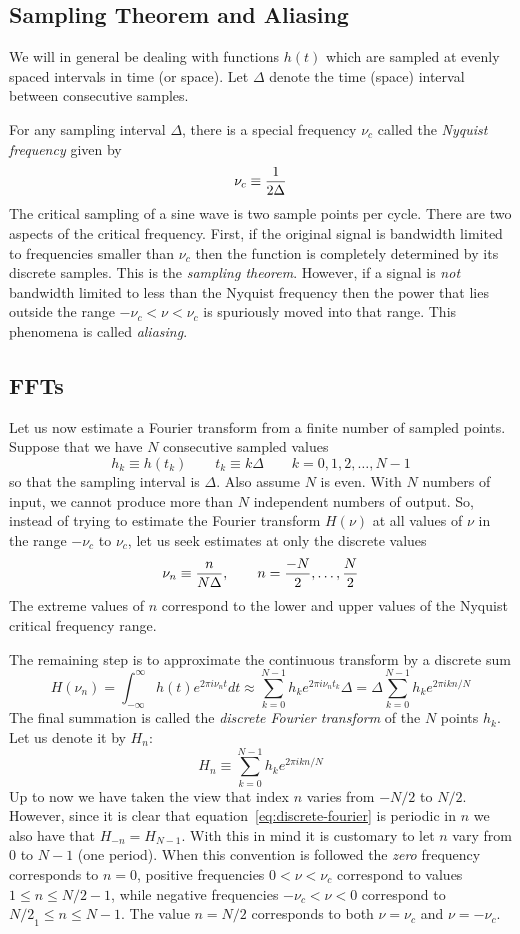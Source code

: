 \documentclass{article}
\newcommand{\be}{\begin{equation}}
\newcommand{\ee}{\end{equation}}
\newcommand{\infint}{\int_{-\infty}^{\infty}}
\begin{document}
\subsection*{Sampling Theorem and Aliasing}

We will in general be dealing with functions $h(t)$ which are sampled
at evenly spaced intervals in time (or space). Let $\Delta$ denote the 
time (space) interval between consecutive samples.

For any sampling interval $\Delta$, there is a special frequency
$\nu_c$ called the {\it Nyquist frequency} given by 
\[
\nu_c\equiv{1\over 2\Delta}
\]
The critical sampling of a sine wave is two sample points per
cycle. There are two aspects of the critical frequency. First, if the
original signal is bandwidth limited to frequencies smaller than
$\nu_c$ then the function is completely determined by its discrete
samples. This is the {\it sampling theorem}. However, if a signal is
{\it not} bandwidth limited to less than the Nyquist frequency then
the power that lies outside the range $-\nu_c<\nu<\nu_c$ is spuriously
moved into that range. This phenomena is called {\it aliasing}. 

\subsection*{FFTs}

Let us now estimate a Fourier transform from a finite number of sampled points.
Suppose that we have $N$ consecutive sampled values
\[
h_k\equiv h(t_k) \qquad t_k\equiv k\Delta \qquad k=0,1,2,\ldots,N-1 
\]
so that the sampling interval is $\Delta$. Also assume $N$ is even. With $N$ 
numbers of input, we cannot produce more than $N$ independent numbers of 
output. So, instead of trying to estimate the Fourier transform $H(\nu)$ at 
all values of $\nu$ in the range $-\nu_c$ to $\nu_c$, let us seek estimates 
at only the discrete values
\[
\nu_n\equiv{n\over N\Delta},\qquad n={-N\over 2},\ldots,{N\over 2} 
\]
The extreme values of $n$ correspond to the lower and upper values of the 
Nyquist critical frequency range. 

The remaining step is to approximate the continuous transform by a discrete 
sum
\[
H(\nu_n)=\infint h(t)e^{2\pi i \nu_nt}dt\approx \sum_{k=0}^{N-1}h_ke^{2\pi i\nu_nt_k}\Delta=\Delta\sum_{k=0}^{N-1}h_k e^{2\pi ikn/N}
\]
The final summation is called the {\it discrete Fourier transform} of the $N$ 
points $h_k$. Let us denote it by $H_n$:
\be
H_n\equiv\sum_{k=0}^{N-1}h_k e^{2\pi ikn/N}
\label{eq:discrete-fourier}
\ee
Up to now we have taken the view that index $n$ varies from $-N/2$ to $N/2$. 
However, since it is clear that equation~\ref{eq:discrete-fourier} is 
periodic in $n$ we also have that $H_{-n}=H_{N-1}$. With this in mind it is 
customary to let $n$ vary from $0$ to $N-1$ (one period). When this convention
is followed the {\it zero} frequency corresponds to $n=0$, positive 
frequencies $0<\nu<\nu_c$ correspond to values $1\le n\le {N/2}-1$, while
negative frequencies $-\nu_c<\nu<0$ correspond to ${N/2}_1\le n \le N-1$. The
value $n={N/2}$ corresponds to both $\nu=\nu_c$ and $\nu=-\nu_c$.
\end{document}
